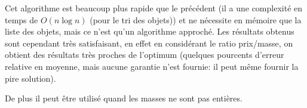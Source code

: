     Cet algorithme est beaucoup plus rapide que le précédent (il a une
    complexité en temps de $O(n \log n)$ (pour le tri des objets)) et ne
    nécessite en mémoire que la liste des objets, mais ce n'est qu'un algorithme
    approché. Les résultats obtenus sont cependant très satisfaisant, en effet
    en considérant le ratio \nobreak prix/masse, on obtient des résultats très
    proches de l'optimum (quelques pourcents d'erreur relative en moyenne, mais
    aucune garantie n'est fournie: il peut même fournir la pire solution).

    De plus il peut être utilisé quand les masses ne sont pas entières.

